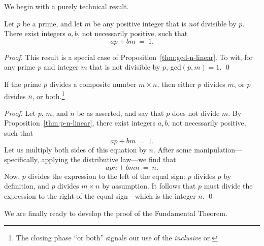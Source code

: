 \medskip

We begin with a purely technical result.

\begin{prop}
\label{thm:p-n-linear}
Let $p$ be a prime, and let $m$ be any positive integer that is {\em not} divisible by $p$.  There exist integers $a, b$, not necessarily positive, such that
\[ ap + bm \ = \ 1. \]
\end{prop}

\begin{proof}
This result is a special case of Proposition~\ref{thm:gcd-n-linear}.   To wit, for any prime $p$ and integer $m$ that is not divisible by $p$,  {\sc gcd}$(p, m) = 1$.  \qed
\end{proof}

\begin{prop}
\label{thm:p-divides-onefactor}
If the prime $p$ divides a composite number $m \times n$, then either $p$ divides $m$, or $p$ divides $n$, or both.\footnote{The closing phase ``or both'' signals our use of the {\em inclusive} or.}
\end{prop}

\begin{proof}
Let $p$, $m$, and $n$ be as asserted, and say that $p$ does not divide $m$.  By Proposition~\ref{thm:p-n-linear}, there exist integers $a, b$, not necessarily positive, such that
\[ ap + bm \ = \ 1. \]
Let us multiply both sides of this equation by $n$.  After some manipulation---specifically, applying the distributive law---we find that
\[ apn + bmn \ = \ n. \]
Now, $p$ divides the expression to the left of the equal sign: $p$ divides $p$ by definition, and $p$ divides $m \times n$ by assumption.  It follows that $p$ must divide the expression to the right of the equal sign---which is the integer $n$.  \qed
\end{proof}

We are finally ready to develop the proof of the Fundamental Theorem.

